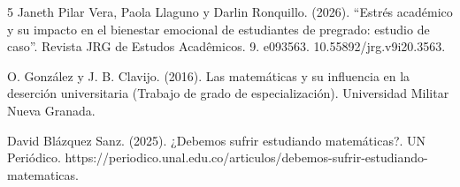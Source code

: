 \documentclass[journal,10pt,twocolumn,letterpaper]{IEEEtran}
\begin{document}
\begin{thebibliography}{5}
Janeth Pilar Vera,  Paola Llaguno y Darlin Ronquillo. (2026). ``Estrés académico y su impacto en el bienestar emocional de estudiantes de pregrado: estudio de caso''. Revista JRG de Estudos Acadêmicos. 9. e093563. 10.55892/jrg.v9i20.3563.

O. González y J. B. Clavijo. (2016). Las matemáticas y su influencia en la deserción universitaria (Trabajo de grado de especialización). Universidad Militar Nueva Granada.

David Blázquez Sanz. (2025). ¿Debemos sufrir estudiando matemáticas?. UN Periódico. https://periodico.unal.edu.co/articulos/debemos-sufrir-estudiando-matematicas.


\end{thebibliography}
\end{document}
